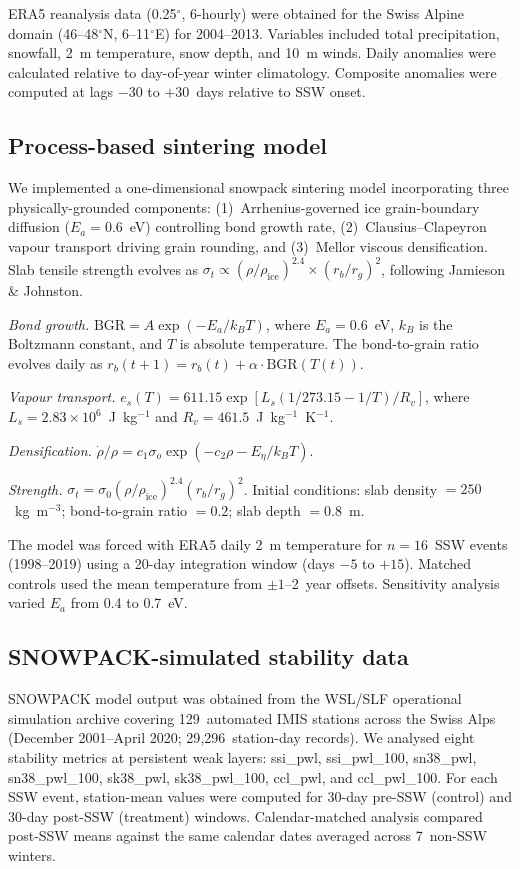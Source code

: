 \documentclass[11pt,letterpaper]{article}
\begin{document}
ERA5 reanalysis data (0.25$^\circ$, 6-hourly) were obtained for the Swiss Alpine domain (46--48$^\circ$N, 6--11$^\circ$E) for 2004--2013. Variables included total precipitation, snowfall, 2~m temperature, snow depth, and 10~m winds. Daily anomalies were calculated relative to day-of-year winter climatology. Composite anomalies were computed at lags $-30$ to $+30$~days relative to SSW onset.

\subsection{Process-based sintering model}

We implemented a one-dimensional snowpack sintering model incorporating three physically-grounded components: (1)~Arrhenius-governed ice grain-boundary diffusion ($E_a = 0.6$~eV) controlling bond growth rate, (2)~Clausius--Clapeyron vapour transport driving grain rounding, and (3)~Mellor viscous densification. Slab tensile strength evolves as $\sigma_t \propto (\rho/\rho_{\text{ice}})^{2.4} \times (r_b/r_g)^2$, following Jamieson \& Johnston.

\textit{Bond growth.} $\mathrm{BGR} = A \exp(-E_a / k_B T)$, where $E_a = 0.6$~eV, $k_B$ is the Boltzmann constant, and $T$ is absolute temperature. The bond-to-grain ratio evolves daily as $r_b(t+1) = r_b(t) + \alpha \cdot \mathrm{BGR}(T(t))$.

\textit{Vapour transport.} $e_s(T) = 611.15 \exp[L_s (1/273.15 - 1/T) / R_v]$, where $L_s = 2.83 \times 10^6$~J~kg$^{-1}$ and $R_v = 461.5$~J~kg$^{-1}$~K$^{-1}$.

\textit{Densification.} $\dot{\rho}/\rho = c_1 \sigma_o \exp(-c_2 \rho - E_\eta / k_B T)$.

\textit{Strength.} $\sigma_t = \sigma_0 (\rho / \rho_{\text{ice}})^{2.4} (r_b / r_g)^2$. Initial conditions: slab density $= 250$~kg~m$^{-3}$; bond-to-grain ratio $= 0.2$; slab depth $= 0.8$~m.

The model was forced with ERA5 daily 2~m temperature for $n = 16$~SSW events (1998--2019) using a 20-day integration window (days $-5$ to $+15$). Matched controls used the mean temperature from $\pm 1$--2~year offsets. Sensitivity analysis varied $E_a$ from 0.4 to 0.7~eV.

\subsection{SNOWPACK-simulated stability data}

SNOWPACK model output was obtained from the WSL/SLF operational simulation archive covering 129~automated IMIS stations across the Swiss Alps (December 2001--April 2020; 29{,}296~station-day records). We analysed eight stability metrics at persistent weak layers: ssi\_pwl, ssi\_pwl\_100, sn38\_pwl, sn38\_pwl\_100, sk38\_pwl, sk38\_pwl\_100, ccl\_pwl, and ccl\_pwl\_100. For each SSW event, station-mean values were computed for 30-day pre-SSW (control) and 30-day post-SSW (treatment) windows. Calendar-matched analysis compared post-SSW means against the same calendar dates averaged across 7~non-SSW winters.
\end{document}
